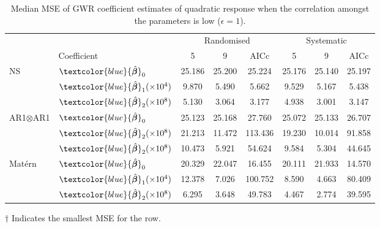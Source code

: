 \documentclass[a4paper]{article} 	%
\newcommand{\Matern}{Mat\'ern }
\newcommand{\zc}[1]{\textcolor{blue}{#1}}
\begin{document}
\begin{table}[!htp]
\centering
\begin{threeparttable}
\caption{Median MSE of GWR coefficient estimates of quadratic response when the correlation amongst the parameters is low ($\epsilon=1$).}\label{tb:MSEquadratic}
\begin{tabular}{llcccccc} \toprule
 &  & \multicolumn{3}{c}{Randomised} & \multicolumn{3}{c}{Systematic} \\ 
 & Coefficient & 5  & 9  & AICc & 5  & 9  & AICc \\ \midrule 
\multirow{3}{*}{NS}   & $\zc{\hat{\bm{\beta}}}_0$ & 25.186 & 25.200 & 25.224 & 25.176 & 25.140\tnote{$\dagger$} & 25.197 \\ 
 & $\zc{\hat{\bm{\beta}}}_1 (\times 10^4)$ & 9.870 & 5.490 & 5.662 & 9.529 & 5.167\tnote{$\dagger$} & 5.438 \\ 
  & $\zc{\hat{\bm{\beta}}}_2 (\times 10^8)$ & 5.130 & 3.064 & 3.177 & 4.938 & 3.001\tnote{$\dagger$} & 3.147 \\  \midrule
\multirow{3}{*}{AR1$\otimes$AR1}  & $\zc{\hat{\bm{\beta}}}_0$ & 25.123 & 25.168 & 27.760 & 25.072\tnote{$\dagger$} & 25.133 & 26.707 \\ 
& $\zc{\hat{\bm{\beta}}}_2 (\times 10^8)$ & 21.213 & 11.472 & 113.436 & 19.230 & 10.014\tnote{$\dagger$} & 91.858 \\ 
& $\zc{\hat{\bm{\beta}}}_2 (\times 10^8)$ & 10.473 & 5.921 & 54.624 & 9.584 & 5.304\tnote{$\dagger$} & 44.645 \\  \midrule
\multirow{3}{*}{\Matern} & $\zc{\hat{\bm{\beta}}}_0$  & 20.329 & 22.047 & 16.455 & 20.111 & 21.933 & 14.570\tnote{$\dagger$} \\ 
&$\zc{\hat{\bm{\beta}}}_1 (\times 10^4)$ & 12.378 & 7.026 & 100.752 & 8.590 & 4.663\tnote{$\dagger$} & 80.409 \\ 
& $\zc{\hat{\bm{\beta}}}_2 (\times 10^8)$  & 6.295 & 3.648 & 49.783 & 4.467 & 2.774\tnote{$\dagger$} & 39.595 \\ 
   \bottomrule
\end{tabular}
\begin{tablenotes}
\item[$\dagger$] \footnotesize Indicates the smallest MSE for the row.
\end{tablenotes}
\end{threeparttable}
\end{table}
\end{document}
